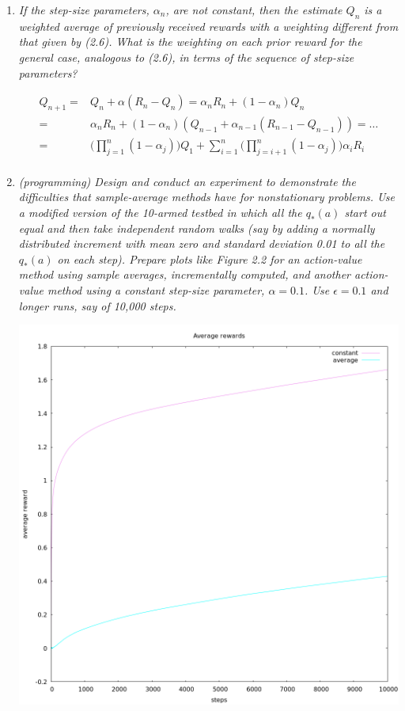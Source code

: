 \documentclass[12pt,a4paper]{article}
\begin{document}
\begin{enumerate}
\item
  \textit{If the step-size parameters, $\alpha_n$, are not constant, then the estimate $Q_n$ is
  a weighted average of previously received rewards with a weighting different from that
  given by (2.6). What is the weighting on each prior reward for the general case, analogous
  to (2.6), in terms of the sequence of step-size parameters?}

  \begin{align*}
  Q_{n + 1} = & Q_n + \alpha(R_n - Q_n) = \alpha_n R_n + (1 - \alpha_n)Q_n \\
  = & \alpha_n R_n + (1 - \alpha_n)(Q_{n - 1} + \alpha_{n - 1}(R_{n - 1} - Q_{n - 1})) = \dots \\
  = & \Big(\prod\limits_{j = 1}^n (1 - \alpha_j)\Big) Q_1 +
  \sum\limits_{i = 1}^n \Big(\prod\limits_{j = i + 1}^n (1 - \alpha_j) \Big)\alpha_i R_i \\
  \end{align*}

\item
  \textit{(programming) Design and conduct an experiment to demonstrate the
  difficulties that sample-average methods have for nonstationary problems. Use a modified
  version of the 10-armed testbed in which all the $q_*(a)$ start out equal and then take
  independent random walks (say by adding a normally distributed increment with mean
  zero and standard deviation 0.01 to all the $q_*(a)$ on each step). Prepare plots like
  Figure 2.2 for an action-value method using sample averages, incrementally computed,
  and another action-value method using a constant step-size parameter, $\alpha = 0.1$. Use
  $\epsilon = 0.1$ and longer runs, say of 10,000 steps.}

  \centering
  \includegraphics[scale=0.3]{average}


\end{enumerate}
\end{document}
